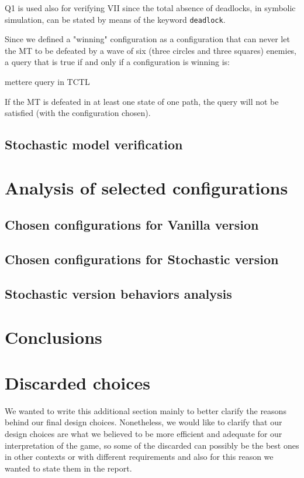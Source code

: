 \documentclass[
10pt, %
a4paper, %
oneside, %
headinclude,footinclude, %
BCOR5mm, %
]{scrartcl}
\begin{document}
				Q1 is used also for verifying VII since the total absence of deadlocks, in symbolic simulation, can be stated by means of the keyword \texttt{deadlock}.
				
				Since we defined a "winning" configuration as a configuration that can never let the MT to be defeated by a wave of six (three circles and three squares) enemies, a query that is true if and only if a configuration is winning is:
				\begin{center}
					mettere query in TCTL
				\end{center}
				If the MT is defeated in at least one state of one path, the query will not be satisfied (with the configuration chosen).
		\subsection{Stochastic model verification}
	\section{Analysis of selected configurations}
		\subsection{Chosen configurations for Vanilla version}
		\subsection{Chosen configurations for Stochastic version}
		\subsection{Stochastic version behaviors analysis}
	\section{Conclusions}

	\newpage
	\appendix
	\section{Discarded choices}
		We wanted to write this additional section mainly to better clarify the reasons behind our final design choices. Nonetheless, we would like to clarify that our design choices are what we believed to be more efficient and adequate for our interpretation of the game, so some of the discarded can possibly be the best ones in other contexts or with different requirements and also for this reason we wanted to state them in the report.
\end{document}
